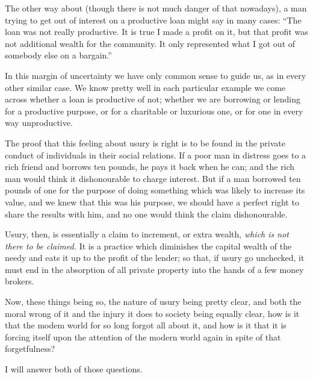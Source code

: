 \documentclass{book}
\begin{document}
The other way about (though there is not much danger of that nowadays), a man trying to get out of interest on a productive loan might say in many cases: “The loan was not really productive. It is true I made a profit on it, but that profit was not additional wealth for the community. It only represented what I got out of somebody else on a bargain.”

In this margin of uncertainty we have only common sense to guide us, as in every other similar case. We know pretty well in each particular example we come across whether a loan is productive of not; whether we are borrowing or lending for a productive purpose, or for a charitable or luxurious one, or for one in every way unproductive.

The proof that this feeling about usury is right is to be found in the private conduct of individuals in their social relations. If a poor man in distress goes to a rich friend and borrows ten pounds, he pays it back when he can; and the rich man would think it dishonourable to charge interest. But if a man borrowed ten pounds of one for the purpose of doing something which was likely to increase its value, and we knew that this was his purpose, we should have a perfect right to share the results with him, and no one would think the claim dishonourable.

Usury, then, is essentially a claim to increment, or extra wealth, \emph{which is not there to be claimed.} It is a practice which diminishes the capital wealth of the needy and eats it up to the profit of the lender; so that, if usury go unchecked, it must end in the absorption of all private property into the hands of a few money brokers.

Now, these things being so, the nature of usury being pretty clear, and both the moral wrong of it and the injury it does to society being equally clear, how is it that the modem world for so long forgot all about it, and how is it that it is forcing itself upon the attention of the modern world again in spite of that forgetfulness?

I will answer both of those questions.
\end{document}
